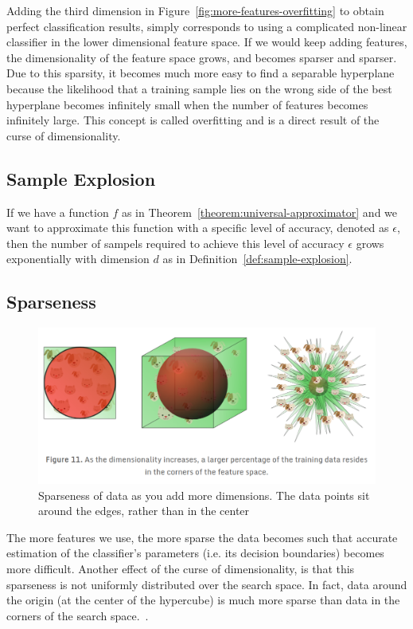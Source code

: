 \documentclass[11pt]{article}
\begin{document}
Adding the third dimension in Figure~\ref{fig:more-features-overfitting} to obtain perfect classification results, simply corresponds to using a complicated non-linear classifier in the lower dimensional feature space. If we would keep adding features, the dimensionality of the feature space grows, and becomes sparser and sparser. Due to this sparsity, it becomes much more easy to find a separable hyperplane because the likelihood that a training sample lies on the wrong side of the best hyperplane becomes infinitely small when the number of features becomes infinitely large. This concept is called overfitting and is a direct result of the curse of dimensionality.

\subsection{Sample Explosion}

If we have a function $f$ as in Theorem~\ref{theorem:universal-approximator} and we want to approximate this function with a specific level of accuracy, denoted as $\epsilon$, then the number of sampels required to achieve this level of accuracy $\epsilon$ grows exponentially with dimension $d$ as in Definition~\ref{def:sample-explosion}.

\subsection{Sparseness}

\begin{figure}[H]
    \centering
    \includegraphics[width=.8\linewidth]{figures/edgeness-of-high-dimensions.png}
    \caption{Sparseness of data as you add more dimensions. The data points sit around the edges, rather than in the center~\cite{visiondummyCurseDimensionality}}\label{fig:edgeness-of-data}
\end{figure}

The more features we use, the more sparse the data becomes such that accurate estimation of the classifier’s parameters (i.e. its decision boundaries) becomes more difficult. Another effect of the curse of dimensionality, is that this sparseness is not uniformly distributed over the search space. In fact, data around the origin (at the center of the hypercube) is much more sparse than data in the corners of the search space.~\cite{visiondummyCurseDimensionality}.
\end{document}
